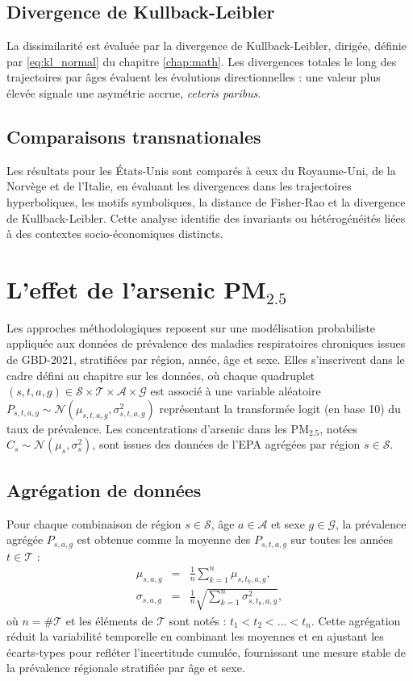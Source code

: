 \subsection{Divergence de Kullback-Leibler}

La dissimilarité est évaluée par la divergence de Kullback-Leibler, dirigée, définie par \eqref{eq:kl_normal} du chapitre \ref{chap:math}. Les divergences totales le long des trajectoires par âges évaluent les évolutions directionnelles : une valeur plus élevée signale une asymétrie accrue, \emph{ceteris paribus}.

\subsection{Comparaisons transnationales}

Les résultats pour les États-Unis sont comparés à ceux du Royaume-Uni, de la Norvège et de l'Italie, en évaluant les divergences dans les trajectoires hyperboliques, les motifs symboliques, la distance de Fisher-Rao et la divergence de Kullback-Leibler. Cette analyse identifie des invariants ou hétérogénéités liées à des contextes socio-économiques distincts.

\section{L'effet de l'arsenic PM$_{2.5}$}
Les approches méthodologiques reposent sur une modélisation probabiliste appliquée aux données de prévalence des maladies respiratoires chroniques issues de GBD-2021, stratifiées par région, année, âge et sexe. Elles s'inscrivent dans le cadre défini au chapitre sur les données, où chaque quadruplet $(s, t, a, g) \in \mathcal{S} \times \mathcal{T} \times \mathcal{A} \times \mathcal{G}$ est associé à une variable aléatoire $P_{s,t,a,g} \sim \mathcal{N}(\mu_{s,t,a,g}, \sigma_{s,t,a,g}^2)$ représentant la transformée logit (en base 10) du taux de prévalence. Les concentrations d'arsenic dans les PM$_{2.5}$, notées $C_s \sim \mathcal{N}(\mu_s, \sigma_s^2)$, sont issues des données de l'EPA agrégées par région $s \in \mathcal{S}$.

\subsection{Agrégation de données}
Pour chaque combinaison de région $s \in \mathcal{S}$, âge $a \in \mathcal{A}$ et sexe $g \in \mathcal{G}$, la prévalence agrégée $P_{s,a,g}$ est obtenue comme la moyenne des $P_{s,t,a,g}$ sur toutes les années $t \in \mathcal{T}$ :
\begin{eqnarray}
\mu_{s,a,g} &=& \frac{1}{n} \sum_{k=1}^n \mu_{s,t_k,a,g}, \\
\sigma_{s,a,g} &=& \frac{1}{n} \sqrt{\sum_{k=1}^n \sigma_{s,t_k,a,g}^2},
\end{eqnarray}
où $n = \#\mathcal{T}$ et les éléments de $\mathcal{T}$ sont notés : $t_1 < t_2 < ... < t_n$. Cette agrégation réduit la variabilité temporelle en combinant les moyennes et en ajustant les écarts-types pour refléter l'incertitude cumulée, fournissant une mesure stable de la prévalence régionale stratifiée par âge et sexe.

